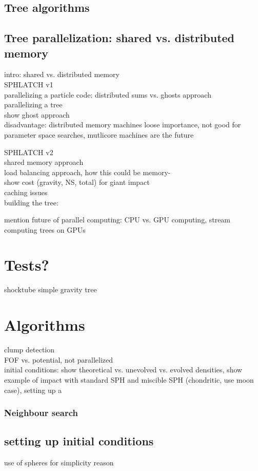 \subsection{Tree algorithms}

\subsection{Tree parallelization: shared vs. distributed memory}
intro: shared vs. distributed memory\\

SPHLATCH v1\\
parallelizing a particle code: distributed sums vs. ghosts approach\\
parallelizing a tree\\
show ghost approach\\

disadvantage: distributed memory machines loose importance, not good for parameter space searches, mutlicore machines are the future


SPHLATCH v2\\
shared memory approach\\
load balancing approach, how this could be memory-\\
show cost (gravity, NS, total) for giant impact\\
caching issues\\

building the tree:

mention future of parallel computing: CPU vs. GPU computing, stream computing
trees on GPUs

\section{Tests?}
shocktube
simple gravity tree

\section{Algorithms}
clump detection\\
FOF vs. potential, not parallelized\\
initial conditions: show theoretical vs. unevolved vs. evolved densities, show example of impact with standard SPH and miscible SPH (chondritic, use moon case), setting up a \SSC \\

\subsubsection{Neighbour search}

\subsection{setting up initial conditions}
use of spheres for simplicity reason

\citep{Barnes:1986p2853}
\citep{Monaghan:2005p2677}
\citep{Price:2004p2613}






